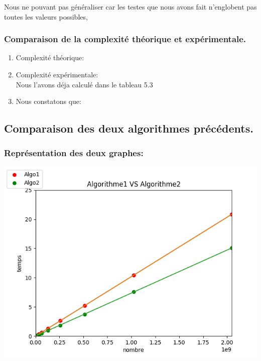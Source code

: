 \documentclass[12pt]{article}
\begin{document}
Nous ne pouvant pas généraliser car les testes que nous avons fait n'englobent pas toutes les valeurs possibles, 
	



\subsubsection{Comparaison de la complexité théorique et expérimentale. }

\begin{enumerate}

	\item Complexité théorique:\\
	

	\item Complexité expérimentale:\\
	
	Nous l'avons déja calculé dans le tableau 5.3
	
	\item Nous constatons que:\\
	
	
\end{enumerate}


\subsection{Comparaison des deux algorithmes précédents.}
\subsubsection{Représentation des deux graphes:}

\includegraphics[width=1\textwidth]{graphe/Algorithme1_VS_Algorithme2.png}
\end{document}
